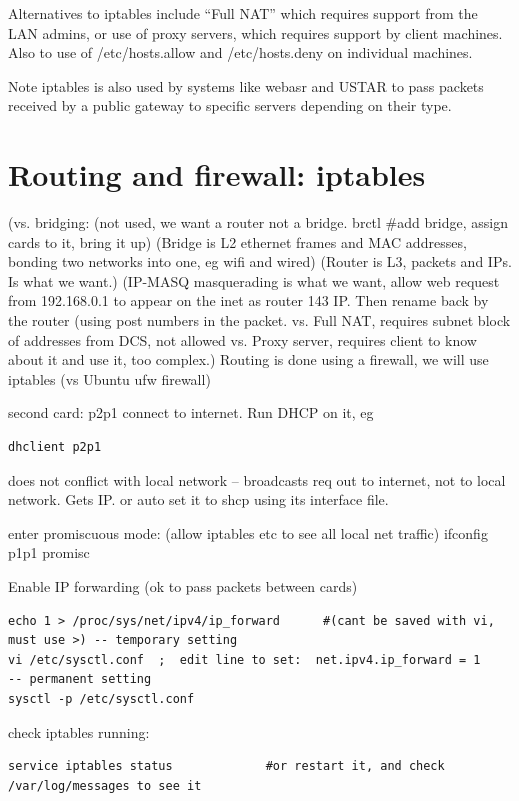 \documentclass[oneside,english]{scrbook}
\begin{document}
Alternatives to iptables include ``Full NAT'' which requires support
from the LAN admins, or use of proxy servers, which requires support
by client machines. Also to use of /etc/hosts.allow and /etc/hosts.deny
on individual machines.

Note iptables is also used by systems like webasr and USTAR to pass
packets received by a public gateway to specific servers depending
on their type.

\section{Routing and firewall: iptables}

 (vs. bridging: (not used, we want a router not a bridge.  brctl    #add bridge, assign cards to it, bring it up)
 (Bridge is L2 ethernet frames and MAC addresses, bonding two networks into one, eg wifi and wired)
 (Router is L3, packets and IPs. Is what we want.)
 (IP-MASQ masquerading is what we want, allow web request from 192.168.0.1 to appear on the inet as router 143 IP. Then rename back by the router (using post numbers in the packet.
   vs. Full NAT, requires subnet  block of addresses from DCS, not allowed
   vs. Proxy server, requires client to know about it and use it, too complex.)
  Routing is done using a firewall, we will use iptables   (vs Ubuntu ufw firewall)

second card: p2p1 connect to internet.   Run DHCP on it, eg
\begin{lstlisting}
dhclient p2p1
\end{lstlisting}
does not conflict with local network -- broadcasts req out to internet, not to local network. Gets IP.
or auto set it to shcp using its interface file.

enter promiscuous mode: (allow iptables etc to see all local net traffic)
ifconfig p1p1 promisc

Enable IP forwarding (ok to pass packets between cards)
\begin{lstlisting}
echo 1 > /proc/sys/net/ipv4/ip_forward      #(cant be saved with vi, must use >) -- temporary setting
vi /etc/sysctl.conf  ;  edit line to set:  net.ipv4.ip_forward = 1    -- permanent setting
sysctl -p /etc/sysctl.conf
\end{lstlisting}

check iptables running:
\begin{lstlisting}
service iptables status             #or restart it, and check /var/log/messages to see it
\end{lstlisting}
\end{document}
